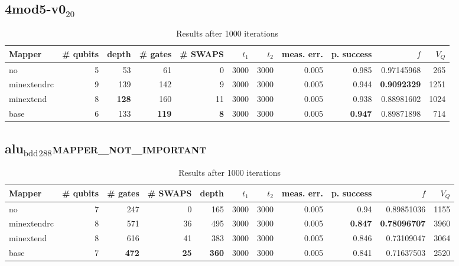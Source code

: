 \documentclass[11pt]{article}
\begin{document}
\subsection{4mod5-v0\(_{\text{20}}\)}
\label{sec:org227e3bc}
\begin{table}[H]
\caption{\label{tab:orgd0b2666}
Results after 1000 iterations}
\centering
\small
\begin{tabular}{lrrrrrrrrrr}
\hline
Mapper & \# qubits & depth & \# gates & \# SWAPS & \(t_1\) & \(t_2\) & meas. err. & p. success & \(f\) & \(V_Q\)\\
\hline
no & 5 & 53 & 61 & 0 & 3000 & 3000 & 0.005 & 0.985 & 0.97145968 & 265\\
\hline
minextendrc & 9 & 139 & 142 & 9 & 3000 & 3000 & 0.005 & 0.944 & \textbf{0.9092329} & 1251\\
minextend & 8 & \textbf{128} & 160 & 11 & 3000 & 3000 & 0.005 & 0.938 & 0.88981602 & 1024\\
base & 6 & 133 & \textbf{119} & \textbf{8} & 3000 & 3000 & 0.005 & \textbf{0.947} & 0.89871898 & 714\\
\hline
\end{tabular}
\end{table}

\subsection{alu\(_{\text{bdd}}\)\(_{\text{288}}\)\hfill{}\textsc{mapper\_not\_important}}
\label{sec:org9a6c25d}

\begin{table}[H]
\caption{\label{tab:org9ab43bc}
Results after 1000 iterations}
\centering
\small
\begin{tabular}{lrrrrrrrrrr}
\hline
Mapper & \# qubits & \# gates & \# SWAPS & depth & \(t_1\) & \(t_2\) & meas. err. & p. success & \(f\) & \(V_Q\)\\
\hline
no & 7 & 247 & 0 & 165 & 3000 & 3000 & 0.005 & 0.94 & 0.89851036 & 1155\\
\hline
minextendrc & 8 & 571 & 36 & 495 & 3000 & 3000 & 0.005 & \textbf{0.847} & \textbf{0.78096707} & 3960\\
minextend & 8 & 616 & 41 & 383 & 3000 & 3000 & 0.005 & 0.846 & 0.73109047 & 3064\\
base & 7 & \textbf{472} & \textbf{25} & \textbf{360} & 3000 & 3000 & 0.005 & 0.841 & 0.71637503 & 2520\\
\hline
\end{tabular}
\end{table}
\end{document}
